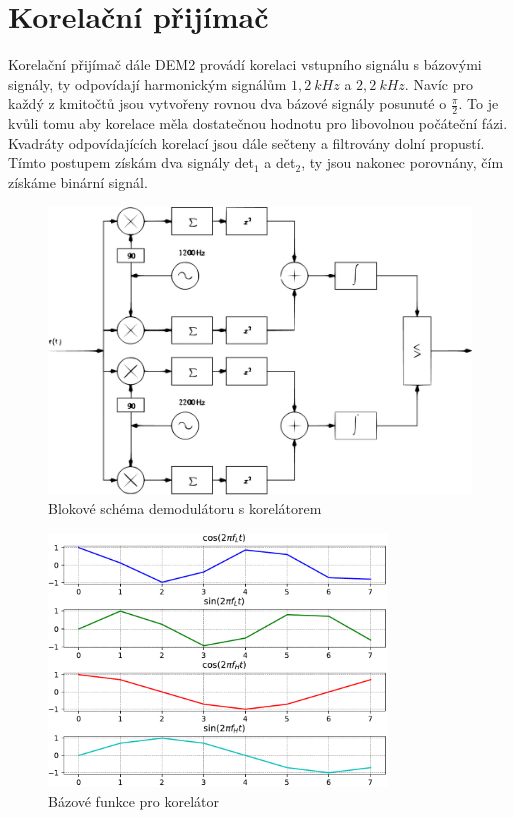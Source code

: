 \section*{Korelační přijímač}

Korelační přijímač dále DEM2 provádí korelaci vstupního signálu s bázovými signály, ty odpovídají harmonickým signálům $1,2~kHz$ a $2,2~kHz$. Navíc pro každý z kmitočtů jsou vytvořeny rovnou dva bázové signály posunuté o $\frac{\pi}{2}$. To je kvůli tomu aby korelace měla dostatečnou hodnotu pro libovolnou počáteční fázi. Kvadráty odpovídajících korelací jsou dále sečteny a filtrovány dolní propustí. Tímto postupem získám dva signály det$_1$ a det$_2$, ty jsou nakonec porovnány, čím získáme binární signál.

\begin{figure}[H]
    \centering
    \includegraphics[width=\textwidth]{img/dem2.pdf}
    \caption{Blokové schéma demodulátoru s korelátorem}
\end{figure}

\begin{figure}[H]
    \centering
    \includegraphics[width=0.8\textwidth]{img/base.pdf}
    \caption{Bázové funkce pro korelátor}
\end{figure}

